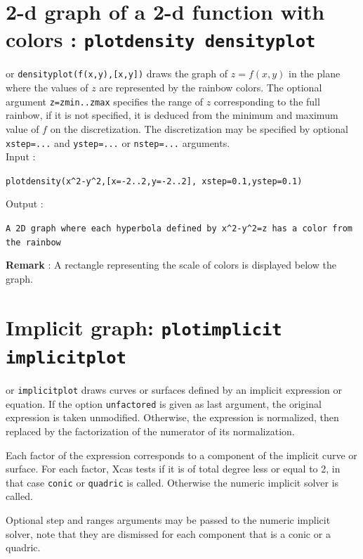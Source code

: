 \documentclass[a4paper,11pt]{book}
\begin{document}
\section{2-d graph of a 2-d function with colors : 
{\tt plotdensity densityplot}}
  or  {\tt densityplot(f(x,y),[x,y])}
draws the graph of $z=f(x,y)$ in the plane where the values of
$z$ are represented by the rainbow colors. The optional argument
{\tt z=zmin..zmax} specifies the range of $z$ corresponding to the
full rainbow, if it is not specified, it is deduced from the minimum
and maximum value of $f$ on the discretization. The discretization
may be specified by optional {\tt xstep=...} and {\tt ystep=...}
or {\tt nstep=...} arguments.\\
Input :
\begin{center}{\tt plotdensity(x\verb|^|2-y\verb|^|2,[x=-2..2,y=-2..2], xstep=0.1,ystep=0.1)}\end{center}
Output :
\begin{center}{\tt A 2D graph where each hyperbola defined by
    x\verb|^|2-y\verb|^|2=z has a color from the rainbow}\end{center}
{\bf Remark} : A rectangle representing the scale of colors is 
displayed below the graph.

\section{Implicit graph: {\tt plotimplicit implicitplot}}
 or {\tt implicitplot} draws curves or 
surfaces defined by an implicit expression or equation. 
If the option {\tt unfactored} is given as last argument, the
original expression is taken unmodified. Otherwise,
the expression is normalized, then replaced by the
factorization of the numerator of its normalization.

Each factor of the expression corresponds to a component
of the implicit curve or surface. For each factor,
Xcas tests if it is of total
degree less or equal to 2, in that case {\tt conic} or
{\tt quadric} is called. Otherwise the numeric implicit solver
is called. 

Optional step and ranges arguments may be passed to the numeric
implicit solver, note that they are dismissed for each component
that is a conic or a quadric.
\end{document}
